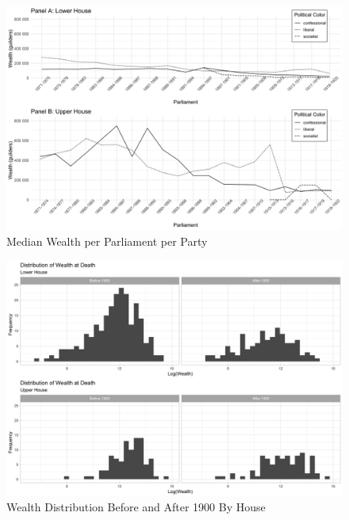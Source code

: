 \begin{landscape}
\begin{figure}
    \centering
    \includegraphics[scale=0.17]{figures/step8fig2wealthperparlperparty.png}
    \caption{Median Wealth per Parliament per Party}
    \label{fig:avgwealthtimeparty}
\end{figure}
\end{landscape}
\clearpage

\begin{landscape}
\begin{figure}
    \centering
    \includegraphics[scale=0.15]{figures/Histogram_wealth_per_parl.png}
    \caption{Wealth Distribution Before and After 1900 By House}
    \label{fig:histogram}
\end{figure}
\end{landscape}
\clearpage

